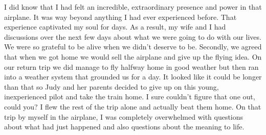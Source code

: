 \documentclass[oneside]{book}
\begin{document}
I did know that I had felt an incredible, extraordinary presence and power in that airplane. It was way beyond anything I had ever experienced before. That experience captivated my soul for days. As a result, my wife and I had discussions over the next few days about what we were going to do with our lives. We were so grateful to be alive when we didn't deserve to be. Secondly, we agreed that when we got home we would sell the airplane and give up the flying idea. On our return trip we did manage to fly halfway home in good weather but then ran into a weather system that grounded us for a day. It looked like it could be longer than that so Judy and her parents decided to give up on this young, inexperienced pilot and take the train home. I sure couldn't figure that one out, could you? I flew the rest of the trip alone and actually beat them home. On that trip by myself in the airplane, I was completely overwhelmed with questions about what had just happened and also questions about the meaning to life.
\end{document}
